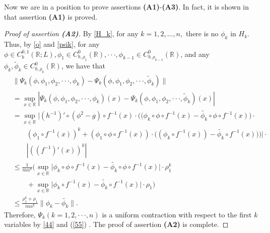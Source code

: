 \documentclass[11pt,reqno,a4paper]{amsart}
\numberwithin{equation}{section}
\begin{document}
Now we are in a position to prove assertions {\bf (A1)}-{\bf (A3)}.
In fact,  it is shown in \cite[page 6]{tx} that assertion {\bf (A1)} is proved. 
\begin{proof}[Proof of assertion {\bf (A2)}]
By \eqref{H_k}, for any $k=1,2,\dots,n,$ there is no $\phi_k$ in $H_k$. Thus, by \eqref{o} and \eqref{psik}, for any $\phi \in C_{b}^{0,1}(\mathbb{R};L), \phi_1 \in C_{b,\rho_1}^0(\mathbb{R}),\cdot\cdot \cdot,\phi_{k-1} \in C_{b,\rho_{k-1}}^0(\mathbb{R})$, and any $\phi_k, \tilde{\phi}_{k} \in C_{b,\rho_k}^0(\mathbb{R}) $, we have that
\begin{align*}
&\|\Psi_k(\phi,\phi_1,\phi_2,\cdot\cdot\cdot,\phi_k)-\Psi_k(\phi,\phi_1,\phi_2,\cdot\cdot\cdot,\tilde{\phi}_k)\|\\
&= \sup_{x \in \mathbb{R}}|\Psi_k(\phi,\phi_1,\phi_2,\cdot\cdot\cdot,\phi_k)(x)-\Psi_k(\phi,\phi_1,\phi_2,\cdot\cdot\cdot,\tilde{\phi}_k)(x)|\\
&=\sup_{x \in \mathbb{R}}\Big| (h^{-1})'\circ(\phi^2-g)\circ f^{-1}(x) \cdot\bigg(\big(\phi_k\circ\phi\circ f^{-1}(x)-\tilde{\phi_k}\circ\phi\circ f^{-1}(x)\big) \cdot
\\
&\qquad (\phi_1 \circ f^{-1}(x))^k+(\phi_1\circ \phi\circ f^{-1}(x)) \cdot \big((\phi_k \circ f^{-1}(x))-\tilde{\phi_k}\circ f^{-1}(x)\big)\bigg)\Big|\cdot
\\
&\qquad |((f^{-1})'(x))^k|\\
&\le \frac{1}{m\alpha^k}\bigg(\sup_{x \in \mathbb{R}}\big|\phi_k\circ\phi\circ f^{-1}(x)-\tilde{\phi_k}\circ\phi\circ f^{-1}(x) \big| \cdot \rho_1^k\\
&\qquad+\sup_{x \in \mathbb{R}}\big|\phi_k\circ f^{-1}(x)-\tilde{\phi_k}\circ f^{-1}(x) \big| \cdot \rho_1 \bigg)\\
&\le \frac{\rho_1^k+\rho_1}{m\alpha^k}\|\phi_k-\tilde{\phi_k}\|.
 \end{align*}
Therefore, $\Psi_k(k=1,2,\cdot \cdot \cdot,n)$ is a uniform contraction with respect to the first $k$ variables by \eqref{44} and (\ref{55}) . The proof  of assertion {\bf(A2)} is complete.
\end{proof}
\end{document}
